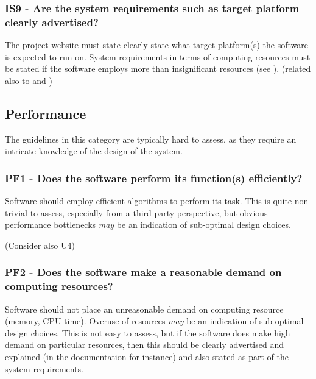 \documentclass[a4paper,11pt]{article}
\newcommand{\criterion}[2]{\subsubsection*{\underline{#1 - #2}}\label{id:#1}}
\newcommand\CheckTable{%
  \begin{tabular}{ccccc}
    No & Minimal & Adequate & Good & Perfect \\
    0 & 1 & 2 & 3 & 4 \\
    \hline
    $\square$ & $\square$ & $\square$ & $\square$ & $\square$ \\
  \end{tabular}%
}
\newcommand{\refcrit}[1]{%
 \framebox[1.1\width]{\hyperref[id:#1]{#1}}
}
\begin{document}
\newcommand{\isNineID}{IS9}
\newcommand{\isNineText}{Are the system requirements such as target platform clearly advertised?}
\criterion{\isNineID}{\isNineText}

The project website must state clearly state what target platform(s) the software is expected to run on.
System requirements in terms of computing resources must be stated if the
software employs more than insignificant resources (see \refcrit{PF2}).
(related also to \refcrit{B3} and \refcrit{IS2})


\subsection{Performance}\label{sec:per}

The guidelines in this category are typically hard to assess, as they require
an intricate knowledge of the design of the system. 

\newcommand{\pfOneID}{PF1}
\newcommand{\pfOneText}{Does the software perform its function(s) efficiently?}
\criterion{\pfOneID}{\pfOneText}

Software should employ efficient algorithms to perform its task. This is quite
non-trivial to assess, especially from a third party perspective, but obvious
performance bottlenecks \emph{may} be an indication of sub-optimal design
choices.

%
%
%
(Consider also U4)


\newcommand{\pfTwoID}{PF2}
\newcommand{\pfTwoText}{Does the software make a reasonable demand on computing resources?}
\criterion{\pfTwoID}{\pfTwoText}

Software should not place an unreasonable demand on computing resource (memory,
CPU time). Overuse of resources \emph{may} be an indication of sub-optimal
design choices.  This is not easy to assess, but if the software does make high
demand on particular resources, then this should be clearly advertised and
explained (in the documentation for instance) and also stated as part of the
system requirements.
\end{document}
